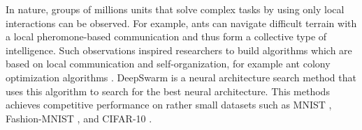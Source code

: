 In nature, groups of millions units that solve complex tasks by using only local interactions can be observed.
For example, ants can navigate difficult terrain with a local pheromone-based communication and thus form a collective type of intelligence.
Such observations inspired researchers to build algorithms which are based on local communication and self-organization, for example ant colony optimization algorithms .
DeepSwarm  is a neural architecture search method that uses this algorithm to search for the best neural architecture.
This methods achieves competitive performance on rather small datasets such as MNIST \cite{Lecun_Bottou_Bengio_Haffner_1998}, Fashion-MNIST \cite{xiao2017/online}, and CIFAR-10 \cite{krizhevsky2009learning}.



